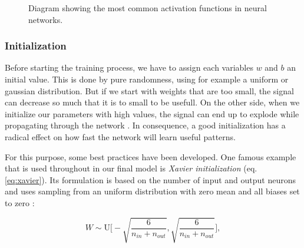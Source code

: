 \begin{figure}[htpb]
  \centering
  \caption[Activation functions]{Diagram showing the most common activation functions in neural networks.}\label{fig:activations}
\end{figure}

\subsubsection{Initialization}

Before starting the training process, we have to assign each variables $ w $ and $ b $ an initial value. This is done by pure randomness, using for example a uniform or gaussian distribution. But if we start with weights that are too small, the signal can decrease so much that it is to small to be usefull. On the other side, when we initialize our parameters with high values, the signal can end up to explode while propagating through the network \parencite{understand_xavier}. In consequence, a good initialization has a radical effect on how fast the network will learn useful patterns.

For this purpose, some best practices have been developed. One famous example that is used throughout in our final model is \textit{Xavier initialization} (eq. \ref{eq:xavier}). Its formulation is based on the number of input and output neurons and uses sampling from an uniform distribution with zero mean and all biases set to zero \parencite{xavier-init}:

\begin{equation} \label{eq:xavier}
  W \sim \textrm{U} \bigg[-\sqrt{\frac{6}{n_{in} + n_{out}}}, \sqrt{\frac{6}{n_{in} + n_{out}}}\bigg] ,
\end{equation}

